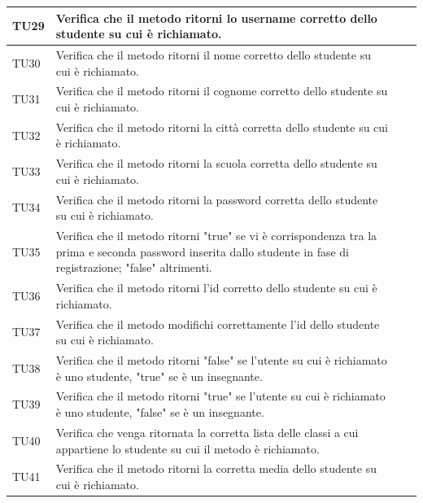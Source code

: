 \begin{longtable}{|>{\centering\arraybackslash}m{1.6cm}|>{\centering\arraybackslash}m{6.41cm}|>{\centering\arraybackslash}m{3.1cm}| c |}
		TU29 & Verifica che il metodo ritorni lo username corretto dello studente su cui è richiamato.\\ \hline
		TU30 & Verifica che il metodo ritorni il nome corretto dello studente su cui è richiamato.  \\ \hline
		TU31 & Verifica che il metodo ritorni il cognome corretto dello studente su cui è richiamato. \\ \hline
		TU32 & Verifica che il metodo ritorni la città corretta dello studente su cui è richiamato.\\ \hline
		TU33 & Verifica che il metodo ritorni la scuola corretta dello studente su cui è richiamato. \\ \hline
		TU34 & Verifica che il metodo ritorni la password corretta dello studente su cui è richiamato. \\ \hline
		TU35 & Verifica che il metodo ritorni "true" se vi è corrispondenza tra la prima e seconda password inserita dallo studente in fase di registrazione; "false" altrimenti.  \\ \hline
		TU36 & Verifica che il metodo ritorni l'id corretto dello studente su cui è richiamato.\\ \hline
		TU37 & Verifica che il metodo modifichi correttamente l'id dello studente su cui è richiamato. \\ \hline
		TU38 & Verifica che il metodo ritorni "false" se l'utente su cui è richiamato è uno studente, "true" se è un insegnante. \\ \hline
		TU39 & Verifica che il metodo ritorni "true" se l'utente su cui è richiamato è uno studente, "false" se è un insegnante. \\ \hline
		TU40 & Verifica che venga ritornata la corretta lista delle classi a cui appartiene lo studente su cui il metodo è richiamato.  \\ \hline
		TU41 & Verifica che il metodo ritorni la corretta media dello studente su cui è richiamato. \\ \hline
		

\end{longtable}
